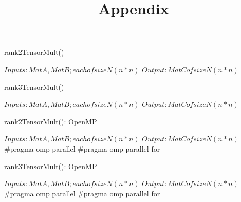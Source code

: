 \documentclass[conference]{IEEEtran}
\begin{document}
\title{Appendix} 
\maketitle

\begin{algorithm}
\caption{rank2TensorMult()}
\SetAlgoLined
\DontPrintSemicolon
\state $  Inputs: MatA, MatB; each  of  size  N (n * n) $\;
       $  Output: MatC  of  size N (n * n) $\;
       \EndFor
\end{algorithm}


\begin{algorithm}
\caption{rank3TensorMult()}
\SetAlgoLined
\DontPrintSemicolon
\state $  Inputs: MatA, MatB; each  of  size  N (n * n) $\;
       $  Output: MatC  of  size N (n * n) $\;
       \EndFor
\end{algorithm}

\begin{algorithm}
\caption{rank2TensorMult(): OpenMP}
\SetAlgoLined
\DontPrintSemicolon
\state $  Inputs: MatA, MatB; each  of  size  N (n * n) $\;
       $  Output: MatC  of  size N (n * n) $\;
         #pragma \hspace omp \hspace parallel \;
         #pragma \hspace omp \hspace parallel for\;
       \EndFor
\end{algorithm}


\begin{algorithm}
\caption{rank3TensorMult(): OpenMP}
\SetAlgoLined
\DontPrintSemicolon
\state $  Inputs: MatA, MatB; each  of  size  N (n * n) $\;
       $  Output: MatC  of  size N (n * n) $\;
       #pragma \hspace omp \hspace parallel \;
       #pragma \hspace omp \hspace parallel for\;
       \EndFor
\end{algorithm}
\end{document}
